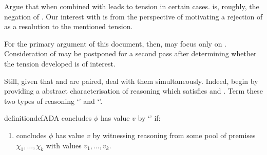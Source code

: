 \begin{note}
  Argue that \ESU{} when combined with \ideaCS{} leads to tension in certain cases.
  \EAS{} is, roughly, the negation of \ideaCS{}.
  Our interest with \EAS{} is from the perspective of motivating a rejection of \ESU{} as a resolution to the mentioned tension.

  For the primary argument of this document, then, may focus only on \ESU{}.
  Consideration of \EAS{} may be postponed for a second pass after determining whether the tension developed is of interest.

  Still, given that \ESU{} and \EAS{} are paired, deal with them simultaneously.
  Indeed, begin by providing a abstract characterisation of reasoning which satisfies \ESU{} and \EAS{}.
  Term these two types of reasoning `\adA{}' and `\adB{}'.
\end{note}

\begin{note}
  \begin{restatable}[\adA{}]{definition}{defADA}
    \label{AR:adA}
    \label{def:adA}
    \vAgent{} concludes \(\phi\) has value \(v\) by `\adA{}' if:
    \begin{enumerate}[label=\textsf{S:\arabic*}., ref=(\textsf{S}:\arabic*)]%
    \item
      \label{def:adA:psi}
      \vAgent{} concludes \(\phi\) has value \(v\) by witnessing reasoning from some  pool of premises \(\chi_{1},\dots,\chi_{k}\) with values \(v_{1},\dots,v_{k}\).
    \end{enumerate}
    \vspace{-\baselineskip}
  \end{restatable}
\end{note}

